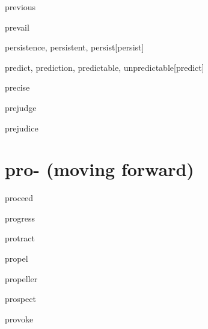 \begin{RefWord}{previous}
\end{RefWord}

\begin{RefWord}{prevail}
\end{RefWord}

\begin{RefWord}{persistence, persistent, persist}[persist]
\end{RefWord}




\begin{RefWord}{predict, prediction, predictable, unpredictable}[predict]
\end{RefWord}

\begin{RefWord}{precise}
\end{RefWord}

\begin{RefWord}{prejudge}
\end{RefWord}

\begin{RefWord}{prejudice}
\end{RefWord}

\section{pro- (moving forward)}

\begin{RefWord}{proceed}
\end{RefWord}

\begin{RefWord}{progress}
\end{RefWord}

\begin{RefWord}{protract}
\end{RefWord}

\begin{RefWord}{propel}
\end{RefWord}

\begin{RefWord}{propeller}
\end{RefWord}

\begin{RefWord}{prospect}
\end{RefWord}

\begin{RefWord}{provoke}
\end{RefWord}

